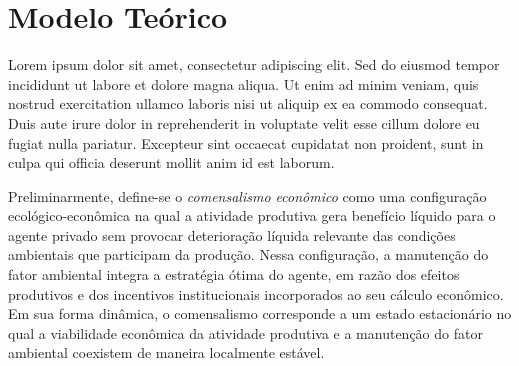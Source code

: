 
\section{Modelo Teórico}









Lorem ipsum dolor sit amet, consectetur adipiscing elit. Sed do eiusmod tempor incididunt ut labore et dolore magna aliqua. Ut enim ad minim veniam, quis nostrud exercitation ullamco laboris nisi ut aliquip ex ea commodo consequat. Duis aute irure dolor in reprehenderit in voluptate velit esse cillum dolore eu fugiat nulla pariatur. Excepteur sint occaecat cupidatat non proident, sunt in culpa qui officia deserunt mollit anim id est laborum.

Preliminarmente, define-se o \textit{comensalismo econômico} como uma configuração ecológico-econômica na qual a atividade produtiva gera benefício líquido para o agente privado sem provocar deterioração líquida relevante das condições ambientais que participam da produção. Nessa configuração, a manutenção do fator ambiental integra a estratégia ótima do agente, em razão dos efeitos produtivos e dos incentivos institucionais incorporados ao seu cálculo econômico. Em sua forma dinâmica, o comensalismo corresponde a um estado estacionário no qual a viabilidade econômica da atividade produtiva e a manutenção do fator ambiental coexistem de maneira localmente estável.


